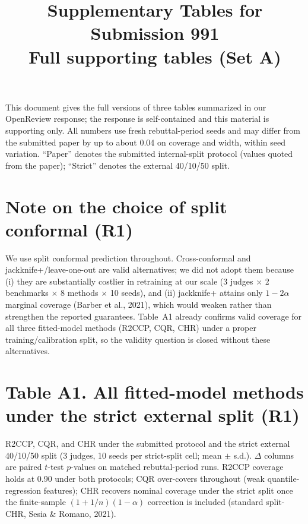 \documentclass[11pt]{article}
\title{Supplementary Tables for Submission 991\\
\large Full supporting tables (Set A)}
\author{}
\date{}
\begin{document}
\maketitle

\noindent
This document gives the full versions of three tables summarized in our OpenReview
response; the response is self-contained and this material is supporting only. All
numbers use fresh rebuttal-period seeds and may differ from the submitted paper by up
to about 0.04 on coverage and width, within seed variation. ``Paper'' denotes the
submitted internal-split protocol (values quoted from the paper); ``Strict'' denotes
the external 40/10/50 split.

\bigskip

\bigskip

\section*{Note on the choice of split conformal (R1)}

We use split conformal prediction throughout. Cross-conformal and jackknife+/leave-one-out
are valid alternatives; we did not adopt them because (i) they are substantially costlier
in retraining at our scale (3 judges $\times$ 2 benchmarks $\times$ 8 methods $\times$
10 seeds), and (ii) jackknife+ attains only $1-2\alpha$ marginal coverage (Barber et al.,
2021), which would weaken rather than strengthen the reported guarantees. Table~A1 already
confirms valid coverage for all three fitted-model methods (R2CCP, CQR, CHR) under a
proper training/calibration split, so the validity question is closed without these
alternatives.

\bigskip

\section*{Table A1. All fitted-model methods under the strict external split (R1)}

R2CCP, CQR, and CHR under the submitted protocol and the strict external 40/10/50 split
(3 judges, 10 seeds per strict-split cell; mean $\pm$ s.d.). $\Delta$ columns are paired
$t$-test $p$-values on matched rebuttal-period runs. R2CCP coverage holds at 0.90 under
both protocols; CQR over-covers throughout (weak quantile-regression features); CHR
recovers nominal coverage under the strict split once the finite-sample
$(1+1/n)(1-\alpha)$ correction is included (standard split-CHR, Sesia \& Romano, 2021).
\end{document}
